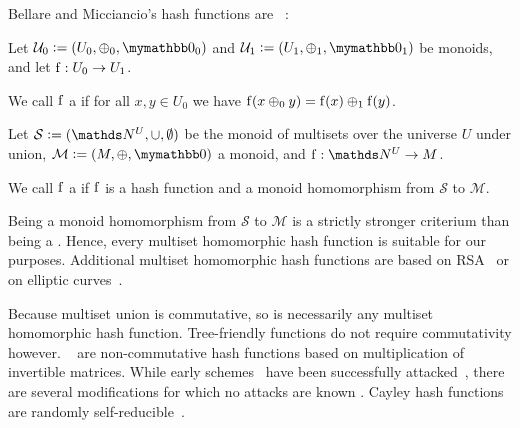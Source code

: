 \documentclass[conference]{IEEEtran}
\begin{document}
Bellare and Micciancio's hash functions are ~\cite{clarke2003incremental}:

\begin{definition}
Let $\mathcal{U}_0 \defeq (U_0, \groupaddsym_0, \neutraladd_0)$ and $\mathcal{U}_1 \defeq (U_1, \groupaddsym_1, \neutraladd_1)$ be monoids, and let ${\operatorname{f}}: {U_0} \rightarrow {U_1}$.

We call $\operatorname{f}$ a  if for all $x, y \in U_0$ we have $\operatorname{f}(x \oplus_0 y) = \operatorname{f}(x) \oplus_1 \operatorname{f}(y)$.
\end{definition}

\begin{definition}
Let $\mathcal{S} \defeq (\N^U, \cup, \emptyset)$ be the monoid of multisets over the universe $U$ under union, $\mathcal{M} \defeq (M, \groupaddsym, \neutraladd)$ a monoid, and $\fun{\f}{\N^U}{M}$.

We call $\operatorname{f}$ a  if $\operatorname{f}$ is a hash function and a monoid homomorphism from $\mathcal{S}$ to $\mathcal{M}$.
\end{definition}

Being a monoid homomorphism from $\mathcal{S}$ to $\mathcal{M}$ is a strictly stronger criterium than being a \somewhatmorphism{}. Hence, every multiset homomorphic hash function is suitable for our purposes. Additional multiset homomorphic hash functions are based on RSA~\cite{cathalo2009comparing} or on elliptic curves~\cite{maitin2017elliptic}.

Because multiset union is commutative, so is necessarily any multiset homomorphic hash function. Tree-friendly functions do not require commutativity however. ~\cite{zemor1991hash}\cite{petit2011rubik} are non-commutative hash functions based on multiplication of invertible matrices. While early schemes~\cite{tillich1994hashing} have been successfully attacked~\cite{grassl2011cryptanalysis}\cite{petit2010preimages}, there are several modifications for which no attacks are known \cite{petit2009graph}\cite{bromberg2017navigating}\cite{sosnovski2016cayley}. Cayley hash functions are randomly self-reducible~\cite{mullan2016text}.

\end{document}

